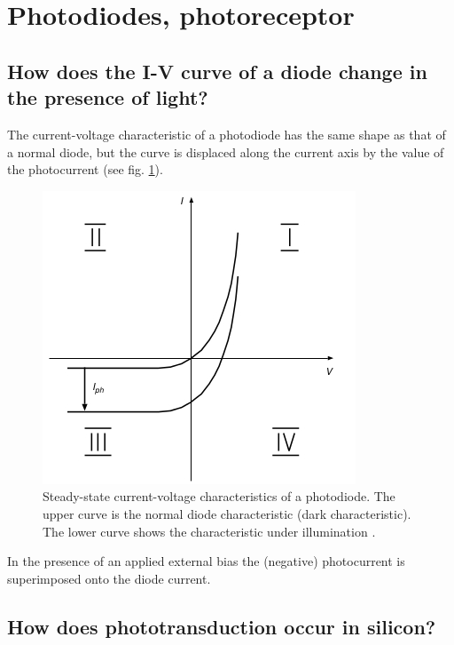 \documentclass[main]{subfiles}
\begin{document}

\section{Photodiodes, photoreceptor}

\subsection{How does the I-V curve of a diode change in the presence of light?}

The current-voltage characteristic of a photodiode has the same
shape as that of a normal diode, but the curve is displaced along the current
axis by the value of the photocurrent (see fig. \ref{fig:photodiode_charac}).

\begin{figure}[htbp]
  \centering
  \includegraphics[scale=0.8]{figs/photodiode_charac.jpg}
  \caption{Steady-state current-voltage characteristics of a photodiode. The upper curve is the normal diode characteristic (dark characteristic). The lower curve shows the characteristic under illumination \cite{book:VLSI}.}
  \label{fig:photodiode_charac}
\end{figure} 

In the presence of an applied external bias the (negative) photocurrent  is superimposed onto the diode current.

\subsection{How does phototransduction occur in silicon?}
\end{document}
